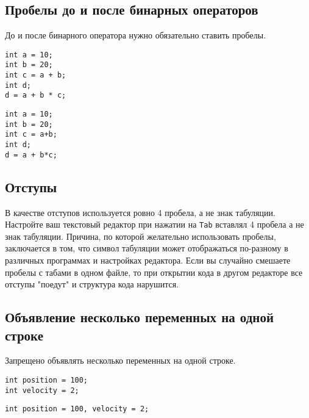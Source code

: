 \documentclass{article}
\begin{document}
\subsection*{Пробелы до и после бинарных операторов}
До и после бинарного оператора нужно обязательно ставить пробелы.
\vspace{-7mm}
\begin{multicols}{2}
\begin{lstlisting}[backgroundcolor = \color{correctcolor}]
int a = 10;
int b = 20;
int c = a + b;
int d;
d = a + b * c;
\end{lstlisting}

\begin{lstlisting}[backgroundcolor = \color{wrongcolor}]
int a = 10;
int b = 20;
int c = a+b;
int d;
d = a + b*c;
\end{lstlisting}
\end{multicols}


\subsection*{Отступы}
В качестве отступов используется ровно 4 пробела, а не знак табуляции.
Настройте ваш текстовый редактор при нажатии на \texttt{Tab} вставлял 4 пробела а не знак табуляции.
Причина, по которой желательно использовать пробелы, заключается в том, что символ табуляции может отображаться по-разному в различных программах и настройках редактора. Если вы случайно смешаете пробелы с табами в одном файле, то при открытии кода в другом редакторе все отступы "поедут" и структура кода нарушится.



\subsection*{Объявление несколько переменных на одной строке}
Запрещено объявлять несколько переменных на одной строке.
\vspace{-7mm}
\begin{multicols}{2}
\begin{lstlisting}[backgroundcolor = \color{correctcolor}]
int position = 100;
int velocity = 2;
\end{lstlisting}

\begin{lstlisting}[backgroundcolor = \color{wrongcolor}]
int position = 100, velocity = 2;
\end{lstlisting}
\end{multicols}
\end{document}
